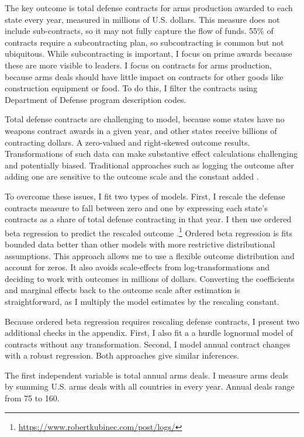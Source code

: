 \documentclass[12pt]{article}
\begin{document}
The key outcome is total defense contracts for arms production awarded to each state every year, measured in millions of U.S. dollars.
This measure does not include sub-contracts, so it may not fully capture the flow of funds. 
55\% of contracts require a subcontracting plan, so subcontracting is common but not ubiquitous.  
While subcontracting is important, I focus on prime awards because these are more visible to leaders. 
I focus on contracts for arms production, because arms deals should have little impact on contracts for other goods like construction equipment or food.
To do this, I filter the contracts using Department of Defense program description codes. 


Total defense contracts are challenging to model, because some states have no weapons contract awards in a given year, and other states receive billions of contracting dollars. 
A zero-valued and right-skewed outcome results. 
Transformations of such data can make substantive effect calculations challenging and potentially biased. 
Traditional approaches such as logging the outcome after adding one are sensitive to the outcome scale and the constant added \citep{ChenRoth2022, MullahyNorton2022}. 


To overcome these issues, I fit two types of models.
First, I rescale the defense contracts measure to fall between zero and one by expressing each state's contracts as a share of total defense contracting in that year.
I then use ordered beta regression to predict the rescaled outcome \citep{Kubinec2022}.\footnote{\url{https://www.robertkubinec.com/post/logs/}} 
Ordered beta regression is fits bounded data better than other models with more restrictive distributional assumptions. 
This approach allows me to use a flexible outcome distribution and account for zeros.
It also avoids scale-effects from log-transformations and deciding to work with outcomes in millions of dollars. 
Converting the coefficients and marginal effects back to the outcome scale after estimation is straightforward, as I multiply the model estimates by the rescaling constant.


Because ordered beta regression requires rescaling defense contracts, I present two additional checks in the appendix. 
First, I also fit a a hurdle lognormal model of contracts without any transformation.
Second, I model annual contract changes with a robust regression. 
Both approaches give similar inferences.


The first independent variable is total annual arms deals.  
I measure arms deals by summing U.S. arms deals with all countries in every year. 
Annual deals range from 75 to 160. 
\end{document}
